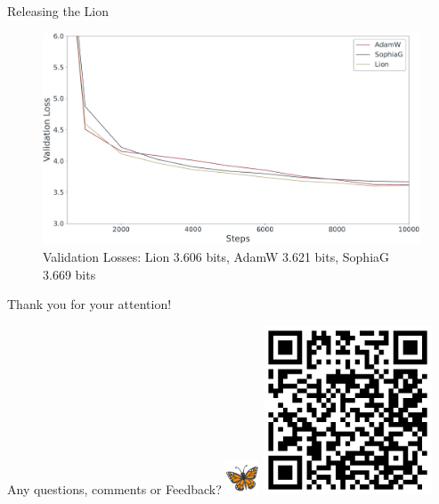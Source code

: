 \documentclass[
	11pt, %
	aspectratio=169, %
]{beamer}
\begin{document}
\begin{frame}{Releasing the Lion}
 \begin{figure}
	\includegraphics[width=12cm]{../results/lion_adam_sophia.pdf}
	\caption*{Validation Losses: Lion 3.606 bits, AdamW 3.621 bits, SophiaG 3.669 bits}
 \end{figure}
\end{frame}



\begin{frame}[plain] %
	\begin{center}
		{\Huge Thank you for your attention! }
		
		\bigskip\bigskip %
		
		{\LARGE Any questions, comments or Feedback? \includegraphics[width=1cm]{figures/vae.png}}
		\includegraphics[width=5cm]{qr_to_wandb.png}
	\end{center}
\end{frame}
\end{document}
